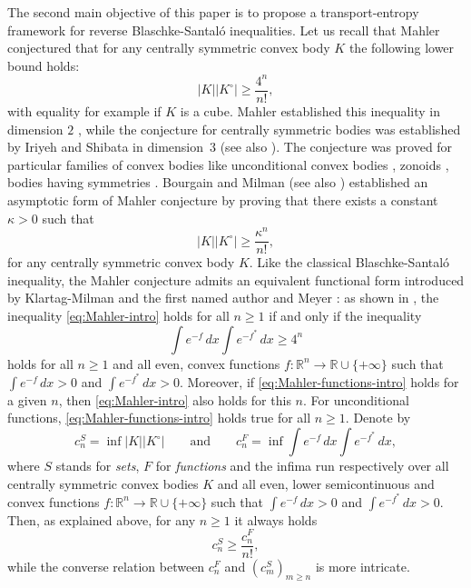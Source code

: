 \documentclass[10pt]{amsart}
\theoremstyle{definition}
\theoremstyle{remark}
\newcommand{\R}{\mathbb{R}}
\begin{document}
The second main objective of this paper is to propose a transport-entropy framework for reverse Blaschke-Santal\'o inequalities. Let us recall that Mahler \cite{Mah39a} conjectured that for any centrally symmetric convex body $K$ the following lower bound holds: 
\begin{equation}\label{eq:Mahler-intro}
|K||K^\circ|\ge \frac{4^n}{n!},
\end{equation}
with equality for example if $K$ is a cube. Mahler established this inequality in dimension $2$ \cite{Mah39b}, while the conjecture for centrally symmetric bodies was established by Iriyeh and Shibata in dimension~$3$ \cite{is20} (see also \cite{fhmrz21}). The conjecture was proved for particular families of convex bodies like unconditional convex bodies \cite{sr81, mey86}, zonoids \cite{R86,GMR88}, bodies having symmetries \cite{bf13, is22}. Bourgain and Milman \cite{bm87} (see also \cite{kup08, naz12, blo14, gpv14, ber20a, ber20b}) established an asymptotic form of Mahler conjecture by proving that there exists a constant $\kappa>0$ such that 
\[
|K||K^\circ|\ge \frac{\kappa^n}{n!},
\] 
for any centrally symmetric convex body $K$.
Like the classical Blaschke-Santal\'o inequality, the Mahler conjecture admits an equivalent functional form introduced by Klartag-Milman \cite{km05} and the first named author and Meyer \cite{fm07, fm08a}: as shown in \cite{fm08a}, the inequality \eqref{eq:Mahler-intro} holds for all $n\geq 1$ if and only if the inequality
\begin{equation}\label{eq:Mahler-functions-intro}
\int e^{-f}\,dx \int e^{-f^*}\,dx \geq 4^n
\end{equation}
holds for all $n\geq1$ and all even, convex functions $f:\R^n \to \R\cup\{+\infty\}$ such that $\int e^{-f}\,dx >0$ and $\int e^{-f^*}\,dx>0$. Moreover, if \eqref{eq:Mahler-functions-intro} holds for a given $n$, then \eqref{eq:Mahler-intro} also holds for this $n$. For unconditional functions, \eqref{eq:Mahler-functions-intro} holds true for all $n\geq1.$ Denote by 
\[
c_n^{S} = \inf |K||K^\circ|\qquad \text{and}\qquad c_n^{F}=\inf \int e^{-f}\,dx \int e^{-f^*}\,dx,
\]
where $S$ stands for \emph{sets}, $F$ for \emph{functions} and the infima run respectively over all centrally symmetric convex bodies $K$ and all even, lower semicontinuous and convex functions $f:\R^n \to \R\cup\{+\infty\}$ such that $\int e^{-f}\,dx >0$ and $\int e^{-f^*}\,dx>0$. Then, as explained above, for any $n\geq 1$ it always holds
\[
c_n^S \geq \frac{c_n^F}{n!},
\] 
while the converse relation between $c_n^{F}$ and $(c_m^{S})_{m\geq n}$ is more intricate.
\end{document}
